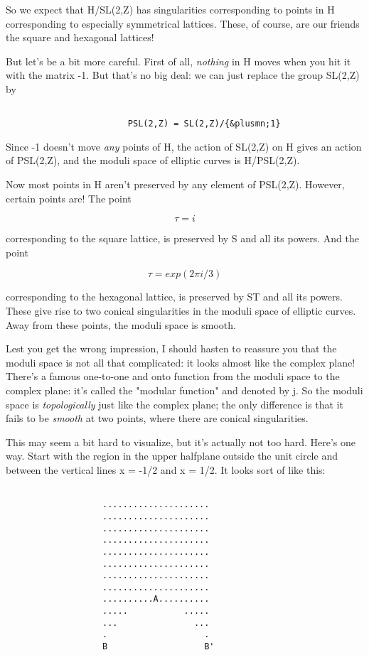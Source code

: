 So we expect that H/SL(2,Z) has singularities corresponding to points in
H corresponding to especially symmetrical lattices.   These, of course,
are our friends the square and hexagonal lattices!

But let's be a bit more careful.  First of all, \emph{nothing} 
in H moves when 
you hit it with the matrix -1.  But that's no big deal: we can just
replace the group SL(2,Z) by 


\begin{verbatim}

                        PSL(2,Z) = SL(2,Z)/{&plusmn;1}
\end{verbatim}
    
Since -1 doesn't move \emph{any} points of H, the action of SL(2,Z) on H
gives an action of PSL(2,Z), and the moduli space of elliptic curves is
H/PSL(2,Z).  

Now most points in H aren't preserved by any element of PSL(2,Z).  
However, certain points are!  The point 


$$

                            \tau  = i
$$
    
corresponding to the square lattice, is preserved by S and all its
powers.  And the point


$$

                         \tau  = exp(2\pi i/3)
$$
    
corresponding to the hexagonal lattice, is preserved by ST and all its
powers.   These give rise to two conical singularities in the moduli
space of elliptic curves.  Away from these points, the moduli space is
smooth.  

Lest you get the wrong impression, I should hasten to reassure you that
the moduli space is not all that complicated: it looks almost like the
complex plane!  There's a famous one-to-one and onto function from the
moduli space to the complex plane: it's called the "modular function"
and denoted by j.  So the moduli space is \emph{topologically} just like the 
complex plane; the only difference is that it fails to be \emph{smooth} at
two points, where there are conical singularities.  

This may seem a bit hard to visualize, but it's actually not too hard.   
Here's one way.  Start with the region in the upper halfplane outside 
the unit circle and between the vertical lines x = -1/2 and x = 1/2.  
It looks sort of like this:


\begin{verbatim}

                   .....................
                   .....................
                   .....................
                   .....................
                   .....................   
                   .....................
                   .....................               
                   .....................         
                   ..........A..........
                   .....           .....
                   ...               ...
                   .                   .
                   B                   B'

\end{verbatim}
    
